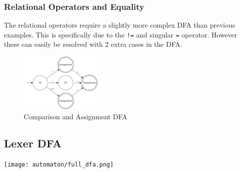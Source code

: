 \documentclass[11pt]{article}
\begin{document}
\subsubsection{Relational Operators and Equality}
\label{sec:orgd49ea73}

The relational operators require a slightly more complex DFA than previous examples. This is specifically due to the \texttt{!=} and singular \texttt{=} operator. However these can easily be resolved with 2 extra cases in the DFA.

\begin{figure}[htbp]
\centering
\includegraphics[width=150px]{automaton/eq_comp.png}
\caption{\label{fig:eq-comp-dfa}Comparison and Assignment DFA}
\end{figure}


\newpage

\subsection{Lexer DFA}
\label{sec:org5ac5eca}


\begin{center}
\texttt{[image: automaton/full\_dfa.png]}
\label{fig:dfa-full}
\end{center}
\end{document}
